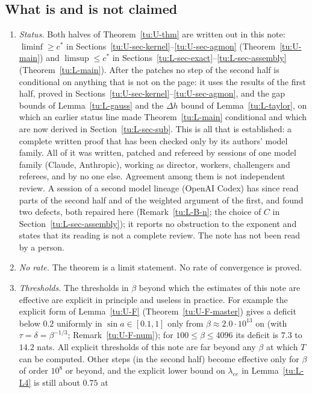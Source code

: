 \subsection{What is and is not claimed}\label{tu:U-sec-status}
\begin{enumerate}
\item \emph{Status.} Both halves of Theorem~\ref{tu:U-thm} are written out in this note:
$\liminf\ge c^*$ in Sections~\ref{tu:U-sec-kernel}--\ref{tu:U-sec-agmon} (Theorem~\ref{tu:U-main}) and
$\limsup\le c^*$ in Sections~\ref{tu:L-sec-exact}--\ref{tu:L-sec-assembly} (Theorem~\ref{tu:L-main}). After the
patches no step of the second half is conditional on anything that is not on the page: it uses the results of
the first half, proved in Sections~\ref{tu:U-sec-kernel}--\ref{tu:U-sec-agmon}, and the gap bounds of
Lemma~\ref{tu:L-gauss} and the $\Delta h$ bound of Lemma~\ref{tu:L-taylor}, on which an earlier status line made
Theorem~\ref{tu:L-main} conditional and which are now derived in Section~\ref{tu:L-sec-sub}. This is all that is
established: a complete written proof that has been checked only by its authors' model family. All of it was
written, patched and refereed by sessions of one model family (Claude, Anthropic), working as director,
workers, challengers and referees, and by no one else. Agreement among them is not independent review. A session of
a second model lineage (OpenAI Codex) has since read parts of the second half and of the weighted argument of the first, and found two
defects, both repaired here (Remark~\ref{tu:L-B-n}; the choice of $C$ in Section~\ref{tu:L-sec-assembly}); it reports no obstruction to the
exponent and states that its reading is not a complete review. The note has not been read by a person.
\item \emph{No rate.} The theorem is a limit statement. No rate of convergence is proved.
\item \emph{Thresholds.} The thresholds in $\beta$ beyond which the estimates of this note are
effective are explicit in principle and useless in practice. For example the explicit form of
Lemma~\ref{tu:U-F} (Theorem~\ref{tu:U-F-master}) gives a deficit below $0.2$ uniformly in
$\sin a\in[0.1,1]$ only from $\beta\approx2.0\cdot10^{13}$ on (with $\tau=\delta=\beta^{-1/3}$;
Remark~\ref{tu:U-F-num}); for $100\le\beta\le4096$ its deficit is $7.3$ to $14.2$ nats. All explicit
thresholds of this note are far beyond any $\beta$ at which $T$ can be computed. Other steps (in the second half) become effective only for $\beta$ of order $10^{8}$ or
beyond, and the explicit lower bound on $\lambda_{ee}$ in Lemma~\ref{tu:L-L4} is still about $0.75$ at

\end{enumerate}

